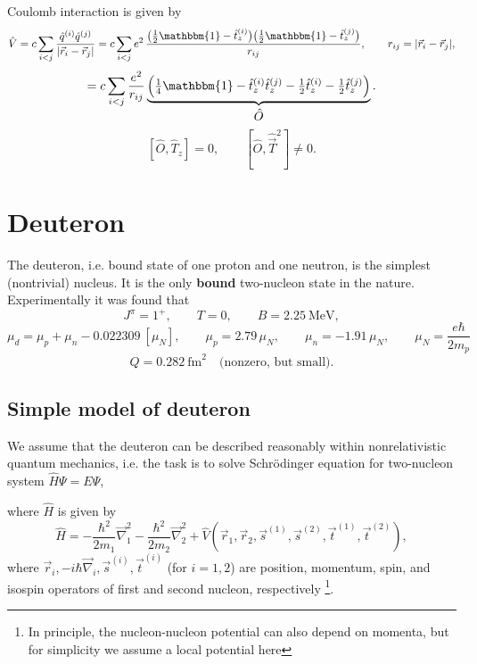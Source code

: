 \documentclass[11pt,a4paper]{article}
\newcommand{\op}[1]{\hat{#1}}
\begin{document}
Coulomb interaction is given by
\[
\op V=c\sum_{i<j}\frac{\op q^{(i)}\op q^{(j)}}{|\vec r_i-\vec r_j|}
=c\sum_{i<j} e^2\,
\frac{\big(\tfrac12 \mathbbm{1} -\op t_z^{(i)}\big)\big(\tfrac12 \mathbbm{1} -\op t_z^{(j)}\big)}{r_{ij}},
\qquad r_{ij}=|\vec r_i-\vec r_j|,
\]
\[
=c\sum_{i<j}\frac{e^2}{r_{ij}}
\underbrace{\Big(\tfrac14 \mathbbm{1} -\op t_z^{(i)}\op t_z^{(j)}
-\tfrac12\op t_z^{(i)}-\tfrac12\op t_z^{(j)}\Big)}_{\displaystyle \op O} .
\]
\[
[\op O,\op T_z]=0, \qquad [\op O,\op {\vec T}^2]\ne 0 .
\]


\section{Deuteron}

The deuteron, i.e. bound state of one proton and one neutron, is the simplest (nontrivial) nucleus. It is the only {\bf bound} two-nucleon state in the nature. 
Experimentally it was found that
\[
J^\pi=1^+,\qquad T=0,\qquad B=2.25\ \text{MeV},
\]
\[
\mu_d=\mu_p+\mu_n-0.022309\ [\mu_N],\qquad
\mu_p=2.79\,\mu_N,\qquad \mu_n=-1.91\,\mu_N,\qquad
\mu_N=\frac{e\hbar}{2m_p}\
\]
\[
Q=0.282\ \text{fm}^2 \quad\text{(nonzero, but small).}
\]
\subsection{Simple model of deuteron}
We assume that the deuteron can be described reasonably within nonrelativistic quantum mechanics, i.e. the task is to solve Schr\"odinger equation for two-nucleon system $\op H\Psi=E\Psi$,
\begin{center}
\end{center}

where $\op H$ is given by
\[
\op H=-\frac{\hbar^2}{2m_1}\vec\nabla_1^2-\frac{\hbar^2}{2m_2}\vec\nabla_2^2
+\op V(\vec r_1,\vec r_2,\vec s^{(1)},\vec s^{(2)},\vec t^{(1)},\vec t^{(2)}), 
\]
where $\vec r_i, -i \hbar\vec \nabla_i,  \vec s^{(i)}, \vec t^{(i)}$ (for $i=1,2$) are position, momentum, spin, and isospin operators of first and second nucleon, respectively \footnote{In principle, the nucleon-nucleon potential can also depend on momenta, but for simplicity we assume a local potential here}. 
\end{document}
